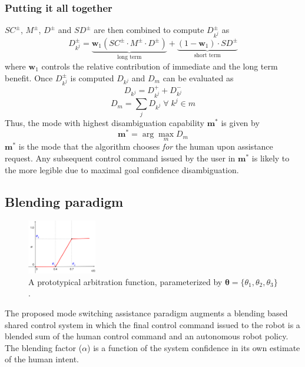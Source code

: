\documentclass[conference]{IEEEtran}
\newcommand{\argmax}{\arg\!\max}
\begin{document}
\subsubsection*{Putting it all together}
$SC^{\pm}$, $M^{\pm}$, $D^{\pm}$ and $SD^{\pm}$ are then combined to compute $D_{k^j}^{\pm}$ as 
\begin{equation*}
D_{k^j}^{\pm} = \underbrace{\boldsymbol{w}_1(SC^{\pm}\cdot M^{\pm} \cdot D^{\pm})}_{\text{long term}} + \underbrace{(1 - \boldsymbol{w}_1)\cdot SD^{\pm}}_{\text{short term}}
\end{equation*}
where $\boldsymbol{w}_1$ controls the relative contribution of immediate and the long term benefit. 
Once $D_{k^j}^{\pm}$ is computed $D_{k^j}$ and $D_m$ can be evaluated as 
\begin{equation*}
D_{k^j} = D_{k^j}^{+} + D_{k^j}^{-}
\end{equation*}
\begin{equation*}
D_m = \sum_{j} D_{k^j} \; \forall \; k^j \in m
\end{equation*}
Thus, the mode with highest disambiguation capability $\boldsymbol{m}^{*}$ is given by
\begin{equation*}
\boldsymbol{m}^* = \argmax_m D_m
\end{equation*}
$\boldsymbol{m}^{*}$ is the mode that the algorithm chooses \textit{for} the human upon assistance request. Any subsequent control command issued by the user in $\boldsymbol{m}^*$ is likely to the more legible due to maximal goal confidence disambiguation.

\subsection{Blending paradigm}\label{BP}
\begin{figure}
	\begin{center}
		\vspace{-.6cm}
		\includegraphics[width=0.27\textwidth]{./figures/Figure2.eps}
	\end{center}
		\vspace{-.45cm}
	\caption{A prototypical arbitration function, parameterized by {\footnotesize $\boldsymbol{\theta} = \{\theta_{1}, \theta_{2}, \theta_{3}\}$}.}
	\label{ALPHA}
\end{figure}
The proposed mode switching assistance paradigm augments a blending based shared control system in which the final control command issued to the robot is a blended sum of the human control command and an autonomous robot policy. The blending factor ($\alpha$) is a function of the system confidence in its own estimate of the human intent. 
\end{document}
